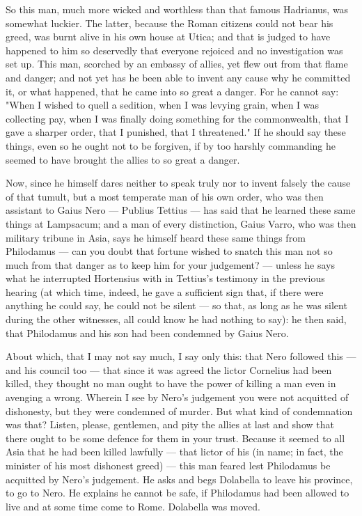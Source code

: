  So this man, much more wicked and worthless than that famous Hadrianus, was somewhat luckier. The latter, because the Roman citizens could not bear his greed, was burnt alive in his own house at Utica; and that is judged to have happened to him so deservedly that everyone rejoiced and no investigation was set up. This man, scorched by an embassy of allies, yet flew out from that flame and danger; and not yet has he been able to invent any cause why he committed it, or what happened, that he came into so great a danger. For he cannot say: "When I wished to quell a sedition, when I was levying grain, when I was collecting pay, when I was finally doing something for the commonwealth, that I gave a sharper order, that I punished, that I threatened." If he should say these things, even so he ought not to be forgiven, if by too harshly commanding he seemed to have brought the allies to so great a danger.

 Now, since he himself dares neither to speak truly nor to invent falsely the cause of that tumult, but a most temperate man of his own order, who was then assistant to Gaius Nero --- Publius Tettius --- has said that he learned these same things at Lampsacum; and a man of every distinction, Gaius Varro, who was then military tribune in Asia, says he himself heard these same things from Philodamus --- can you doubt that fortune wished to snatch this man not so much from that danger as to keep him for your judgement? --- unless he says what he interrupted Hortensius with in Tettius's testimony in the previous hearing (at which time, indeed, he gave a sufficient sign that, if there were anything he could say, he could not be silent --- so that, as long as he was silent during the other witnesses, all could know he had nothing to say): he then said, that Philodamus and his son had been condemned by Gaius Nero.

 About which, that I may not say much, I say only this: that Nero followed this --- and his council too --- that since it was agreed the lictor Cornelius had been killed, they thought no man ought to have the power of killing a man even in avenging a wrong. Wherein I see by Nero's judgement you were not acquitted of dishonesty, but they were condemned of murder. But what kind of condemnation was that? Listen, please, gentlemen, and pity the allies at last and show that there ought to be some defence for them in your trust. Because it seemed to all Asia that he had been killed lawfully --- that lictor of his (in name; in fact, the minister of his most dishonest greed) --- this man feared lest Philodamus be acquitted by Nero's judgement. He asks and begs Dolabella to leave his province, to go to Nero. He explains he cannot be safe, if Philodamus had been allowed to live and at some time come to Rome. Dolabella was moved.

